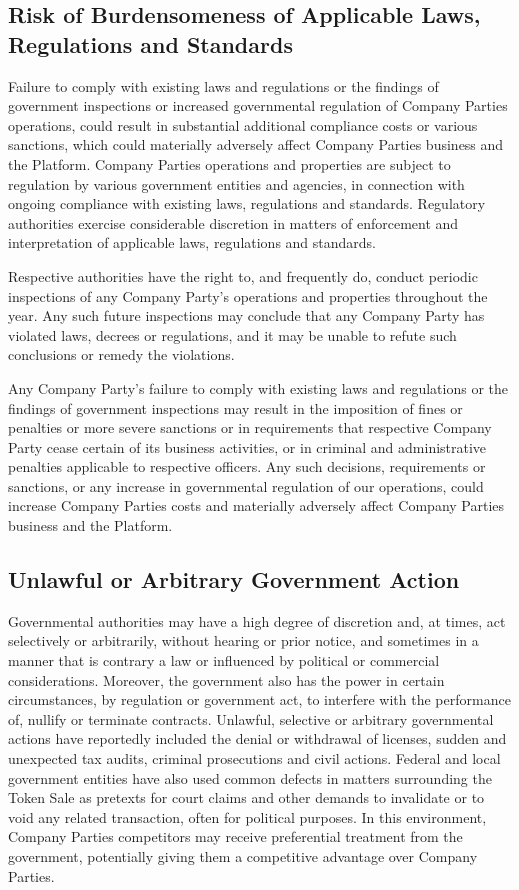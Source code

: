 \documentclass[12pt]{report}
\begin{document}
\subsection{Risk of Burdensomeness of Applicable Laws, Regulations and Standards}
Failure to comply with existing laws and regulations or the findings of government inspections or increased governmental regulation of Company Parties operations, could result in substantial additional compliance costs or various sanctions, which could materially adversely affect Company Parties business and the Platform. Company Parties operations and properties are subject to regulation by various government entities and agencies, in connection with ongoing compliance with existing laws, regulations and standards. Regulatory authorities exercise
considerable discretion in matters of enforcement and interpretation of applicable laws, regulations and standards.

Respective authorities have the right to, and frequently do, conduct periodic inspections of any Company Party’s operations and properties throughout the year. Any such future inspections may conclude that any Company Party has violated laws, decrees or regulations, and it may be unable to refute such conclusions or remedy the violations.

Any Company Party’s failure to comply with existing laws and regulations or the findings of government inspections may result in the imposition of fines or penalties or more severe sanctions or in requirements that respective Company Party cease certain of its business activities, or in criminal and administrative penalties applicable to respective officers. Any such decisions, requirements or sanctions, or any increase in governmental regulation of our operations, could increase Company Parties costs and materially adversely affect Company Parties business
and the Platform.

\subsection{Unlawful or Arbitrary Government Action}
Governmental authorities may have a high degree of discretion and, at times, act selectively or arbitrarily, without hearing or prior notice, and sometimes in a manner that is contrary a law or influenced by political or commercial considerations. Moreover, the government also has the power in certain circumstances, by regulation or government act, to interfere with the performance of, nullify or terminate contracts. Unlawful, selective or arbitrary governmental actions have reportedly included the denial or withdrawal of licenses, sudden and unexpected tax audits, criminal prosecutions and civil actions. Federal and local government entities have also used common defects in matters surrounding the Token Sale as pretexts for court claims and other demands to invalidate or to void any related transaction, often for political purposes. In this environment, Company Parties competitors may receive preferential treatment from the government, potentially giving them a competitive advantage over Company Parties.

\end{document}
